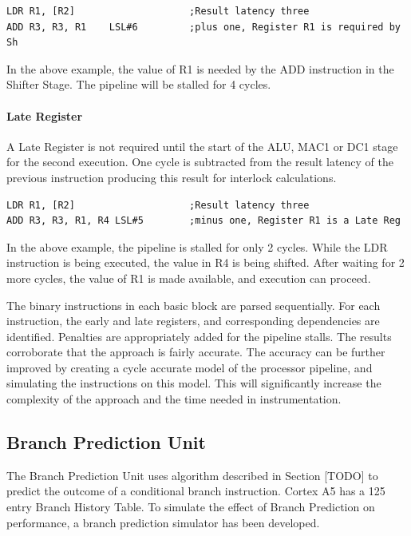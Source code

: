 \begin{Example}
\begin{lstlisting}
LDR R1, [R2]                    ;Result latency three
ADD R3, R3, R1    LSL#6         ;plus one, Register R1 is required by Sh
\end{lstlisting}
\end{Example}
\vspace*{-10pt}

In the above example, the value of R1 is needed by the ADD instruction in the Shifter Stage. The pipeline will be stalled for 4 cycles.

\vspace*{-10pt}
\paragraph{Late Register}
A Late Register is not required until the start of the ALU, MAC1 or DC1 stage for the second execution. One cycle is subtracted from the result latency of the previous instruction producing this result for interlock calculations.

\begin{Example}
\begin{lstlisting}
LDR R1, [R2]                    ;Result latency three
ADD R3, R3, R1, R4 LSL#5        ;minus one, Register R1 is a Late Reg
\end{lstlisting}
\end{Example}
\vspace*{-10pt}

In the above example, the pipeline is stalled for only 2 cycles. While the LDR instruction is being executed, the value in R4 is being shifted. After waiting for 2 more cycles, the value of R1 is made available, and execution can proceed.

The binary instructions in each basic block are parsed sequentially. For each instruction, the early and late registers, and corresponding dependencies are identified. Penalties are appropriately added for the pipeline stalls. The results corroborate that the approach is fairly accurate. The accuracy can be further improved by creating a cycle accurate model of the processor pipeline, and simulating the instructions on this model. This will significantly increase the complexity of the approach and the time needed in instrumentation.

\subsection{Branch Prediction Unit}
The Branch Prediction Unit uses algorithm described in Section [TODO] to predict the outcome of a conditional branch instruction. Cortex A5 has a 125 entry Branch History Table. To simulate the effect of Branch Prediction on performance, a branch prediction simulator has been developed.

